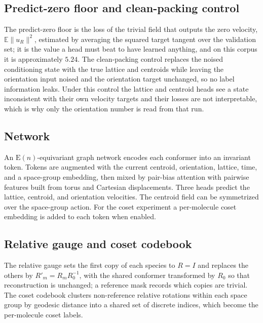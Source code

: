 \documentclass[11pt]{article}
\begin{document}
\subsection{Predict-zero floor and clean-packing control}
The predict-zero floor is the loss of the trivial field that outputs the zero
velocity, $\mathbb{E}\lVert u_R\rVert^2$, estimated by averaging the squared
target tangent over the validation set; it is the value a head must beat to have
learned anything, and on this corpus it is approximately $5.24$. The
clean-packing control replaces the noised conditioning state with the true
lattice and centroids while leaving the orientation input noised and the
orientation target unchanged, so no label information leaks. Under this control
the lattice and centroid heads see a state inconsistent with their own velocity
targets and their losses are not interpretable, which is why only the orientation
number is read from that run.

\subsection{Network}
An $\mathrm{E}(n)$-equivariant graph network\cite{satorras2021egnn} encodes each
conformer into an invariant token. Tokens are augmented with the current
centroid, orientation, lattice, time, and a space-group embedding, then mixed by
pair-bias attention with pairwise features built from torus and Cartesian
displacements. Three heads predict the lattice, centroid, and orientation
velocities. The centroid field can be symmetrized over the space-group action.
For the coset experiment a per-molecule coset embedding is added to each token
when enabled.

\subsection{Relative gauge and coset codebook}
The relative gauge sets the first copy of each species to $R=I$ and replaces the
others by $R'_m = R_m R_0^{-1}$, with the shared conformer transformed by
$R_0$ so that reconstruction is unchanged; a reference mask records which copies
are trivial. The coset codebook clusters non-reference relative rotations within
each space group by geodesic distance into a shared set of discrete indices,
which become the per-molecule coset labels.
\end{document}
